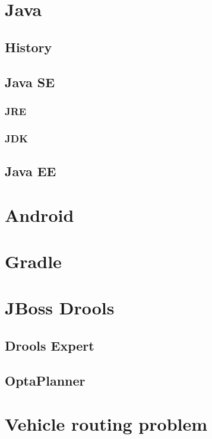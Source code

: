 \section{Java}

  \subsection{History}

  \subsection{Java SE}

    \subsubsection{JRE}

    \subsubsection{JDK}

  \subsection{Java EE}


\section{Android}



\section{Gradle}


\section{JBoss Drools}

  \subsection{Drools Expert}

  \subsection{OptaPlanner}


\section{Vehicle routing problem}




